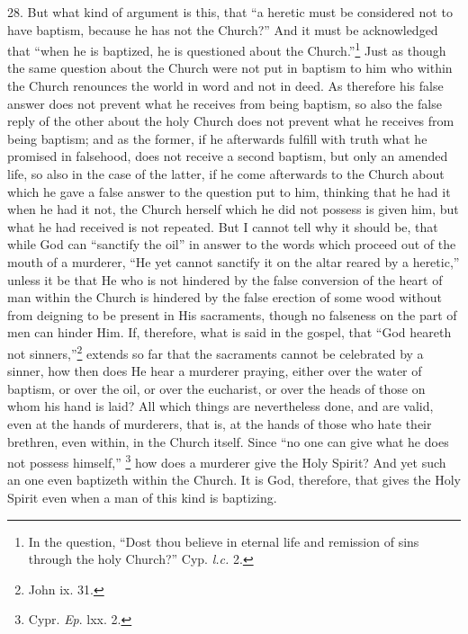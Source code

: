 28. But what kind of argument is this, that ``a heretic must be considered not to have baptism, because he has not the Church?'' And it must be acknowledged that ``when he is baptized, he is questioned about the Church.''\footnote{\par  In the question, ``Dost thou believe in eternal life and remission of sins through the holy Church?'' Cyp. \emph{l.c.} 2.} Just as though the same question about the Church were not put in baptism to him who within the Church renounces the world in word and not in deed. As therefore his false answer does not prevent what he receives from being baptism, so also the false reply of the other about the holy Church does not prevent what he receives from being baptism; and as the former, if he afterwards fulfill with truth what he promised in falsehood, does not receive a second baptism, but only an amended life, so also in the case of the latter, if he come afterwards to the Church about which he gave a false answer to the question put to him, thinking that he had it when he had it not, the Church herself which he did not possess is given him, but what he had received is not repeated. But I cannot tell why it should be, that while God can ``sanctify the oil'' in answer to the words which proceed out of the mouth of a murderer, ``He yet cannot sanctify it on the altar reared by a heretic,'' unless it be that He who is not hindered by the false conversion of the heart of man within the Church is hindered by the false erection of some wood without from deigning to be present in His sacraments, though no falseness on the part of men can hinder Him. If, therefore, what is said in the gospel, that ``God heareth not sinners,''\footnote{\par  John ix. 31.} extends so far that the sacraments cannot be celebrated by a sinner, how then does He hear a murderer praying, either over the water of baptism, or over the oil, or over the eucharist, or over the heads of those on whom his hand is laid? All which things are nevertheless done, and are valid, even at the hands of murderers, that is, at the hands of those who hate their brethren, even within, in the Church itself. Since ``no one can give what he does not possess himself,'' \footnote{\par  Cypr. \emph{Ep}. lxx. 2.} how does a murderer give the Holy Spirit? And yet such an one even baptizeth within the Church. It is God, therefore, that gives the Holy Spirit even when a man of this kind is baptizing.


